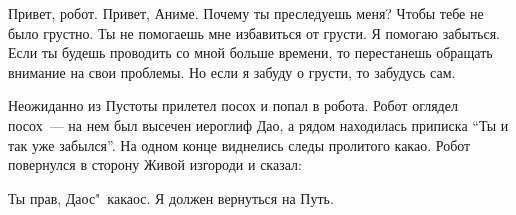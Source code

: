 \begin{dialog}
\X Привет, робот.
\R Привет, Аниме. Почему ты преследуешь меня?
\X Чтобы тебе не было грустно.
\R Ты не помогаешь мне избавиться от грусти.
\X Я помогаю забыться. Если ты будешь проводить со мной больше времени, то перестанешь обращать внимание на свои проблемы.
\R Но если я забуду о грусти, то забудусь сам.
\end{dialog}

\begin{monolog}
Неожиданно из Пустоты прилетел посох и попал в робота. Робот оглядел посох~--- на нем был высечен иероглиф Дао, а рядом находилась приписка “Ты и так уже забылся”. На одном конце виднелись следы пролитого какао. Робот повернулся в сторону Живой изгороди и сказал:
\end{monolog}

\begin{dialog}
\R Ты прав, Даос"~какаос. Я должен вернуться на Путь.
\end{dialog}